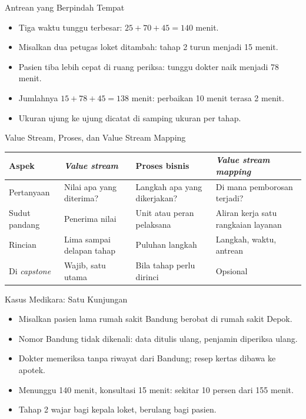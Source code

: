 \documentclass[aspectratio=169, table, 12pt]{beamer}
\begin{document}
\begin{frame}{{\Large Antrean yang Berpindah Tempat}}
  \vspace{10pt}
  \begin{itemize}
    \item Tiga waktu tunggu terbesar: $25 + 70 + 45 = 140$ menit.
    \item Misalkan dua petugas loket ditambah: tahap 2 turun menjadi 15 menit.
    \item Pasien tiba lebih cepat di ruang periksa: tunggu dokter naik menjadi 78 menit.
    \item Jumlahnya $15 + 78 + 45 = 138$ menit: perbaikan 10 menit terasa 2 menit.
    \item Ukuran ujung ke ujung dicatat di samping ukuran per tahap.
  \end{itemize}
\end{frame}

\begin{frame}{{\Large Value Stream, Proses, dan Value Stream Mapping}}
  \footnotesize
  \begin{tabularx}{\textwidth}{>{\raggedright\arraybackslash}p{2.4cm}
      >{\raggedright\arraybackslash}X >{\raggedright\arraybackslash}X
      >{\raggedright\arraybackslash}X}
    \hline
    \textbf{Aspek} & \textbf{\textit{Value stream}} & \textbf{Proses bisnis} &
      \textbf{\textit{Value stream mapping}} \\
    \hline
    Pertanyaan & Nilai apa yang diterima? & Langkah apa yang dikerjakan? & Di mana pemborosan terjadi? \\
    \hline
    Sudut pandang & Penerima nilai & Unit atau peran pelaksana & Aliran kerja satu rangkaian layanan \\
    \hline
    Rincian & Lima sampai delapan tahap & Puluhan langkah & Langkah, waktu, antrean \\
    \hline
    Di \textit{capstone} & Wajib, satu utama & Bila tahap perlu dirinci & Opsional \\
    \hline
  \end{tabularx}
\end{frame}

\begin{frame}{{\Large Kasus Medikara: Satu Kunjungan}}
  \vspace{10pt}
  \begin{itemize}
    \item Misalkan pasien lama rumah sakit Bandung berobat di rumah sakit Depok.
    \item Nomor Bandung tidak dikenali: data ditulis ulang, penjamin diperiksa ulang.
    \item Dokter memeriksa tanpa riwayat dari Bandung; resep kertas dibawa ke apotek.
    \item Menunggu 140 menit, konsultasi 15 menit: sekitar 10 persen dari 155 menit.
    \item Tahap 2 wajar bagi kepala loket, berulang bagi pasien.
  \end{itemize}
\end{frame}
\end{document}
